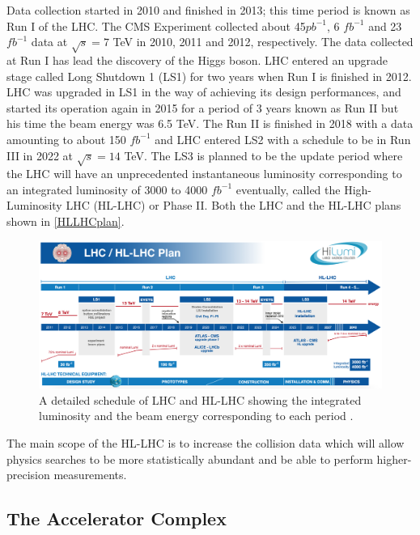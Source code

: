 Data collection started in 2010 and finished in 2013; this time period is known as Run I of the LHC. The CMS Experiment collected about 45$pb^{-1}$, 6 $fb^{-1}$ and 23 $fb^{-1}$ data at $\sqrt{s}=7$ TeV in 2010, 2011 and 2012, respectively. The data collected at Run I has lead the discovery of the Higgs boson. LHC entered an upgrade stage called Long Shutdown 1 (LS1) for two years when Run I is finished in 2012. LHC was upgraded in LS1 in the way of achieving its design performances, and started its operation again in 2015 for a period of 3 years known as Run II but his time the beam energy was 6.5 TeV. The Run II is finished in 2018 with a data amounting to about 150 $fb^{-1}$ and LHC entered LS2 with a schedule to be in Run III in 2022 at $\sqrt{s}=14$ TeV. The LS3 is planned to be the update period where the LHC will have an unprecedented instantaneous luminosity corresponding to an integrated luminosity of 3000 to 4000 $fb^{-1}$ eventually, called the High-Luminosity LHC (HL-LHC) or Phase II. Both the LHC and the HL-LHC plans shown in \autoref{HLLHCplan}.

\begin{figure}[ht]
	\centering
	\includegraphics[width=\textwidth]{MSc_Thesis/fig/HLLHCplan.png}
	\vspace{2mm}
	\caption[A detailed schedule of LHC and HL-LHC showing the integrated luminosity and the beam energy corresponding to each period.]
	{A detailed schedule of LHC and HL-LHC showing the integrated luminosity and the beam energy corresponding to each period \cite{Apollinari:2284929}.}
	\label{HLLHCplan}
\end{figure}

The main scope of the HL-LHC is to increase the collision data which will allow physics searches to be more statistically abundant and be able to perform higher-precision measurements.

\subsection{The Accelerator Complex}

